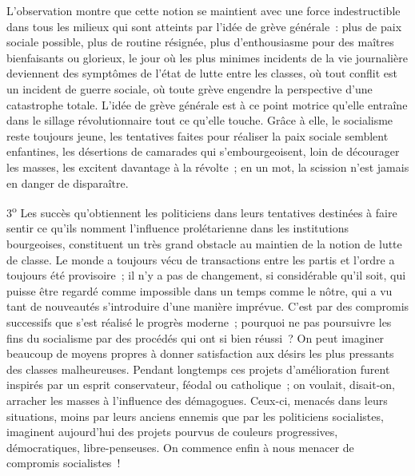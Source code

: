 \documentclass[french,twoside]{book} %
\begin{document}
L’observation montre que cette notion se maintient avec une force indestructible dans tous les milieux qui sont atteints par l’idée de grève générale : plus de paix sociale possible, plus de routine résignée, plus d’enthousiasme pour des maîtres bienfaisants ou glorieux, le jour où les plus minimes incidents de la vie journalière deviennent des symptômes de l’état de lutte entre les classes, où tout conflit est un incident de guerre sociale, où toute grève engendre la perspective d’une catastrophe totale. L’idée de grève générale est à ce point motrice qu’elle entraîne dans le sillage révolutionnaire tout ce qu’elle touche. Grâce à elle, le socialisme reste toujours jeune, les tentatives faites pour réaliser la paix sociale semblent enfantines, les désertions de camarades qui s’embourgeoisent, loin de décourager les masses, les excitent davantage à la révolte ; en un mot, la scission n’est jamais en danger de disparaître.\par
3\textsuperscript{o} Les succès qu’obtiennent les politiciens dans leurs tentatives destinées à faire sentir ce qu’ils nomment l’influence prolétarienne dans les institutions bourgeoises,  constituent un très grand obstacle au maintien de la notion de lutte de classe. Le monde a toujours vécu de transactions entre les partis et l’ordre a toujours été provisoire ; il n’y a pas de changement, si considérable qu’il soit, qui puisse être regardé comme impossible dans un temps comme le nôtre, qui a vu tant de nouveautés s’introduire d’une manière imprévue. C’est par des compromis successifs que s’est réalisé le progrès moderne ; pourquoi ne pas poursuivre les fins du socialisme par des procédés qui ont si bien réussi ? On peut imaginer beaucoup de moyens propres à donner satisfaction aux désirs les plus pressants des classes malheureuses. Pendant longtemps ces projets d’amélioration furent inspirés par un esprit conservateur, féodal ou catholique ; on voulait, disait-on, arracher les masses à l’influence des démagogues. Ceux-ci, menacés dans leurs situations, moins par leurs anciens ennemis que par les politiciens socialistes, imaginent aujourd’hui des projets pourvus de couleurs progressives, démocratiques, libre-penseuses. On commence enfin à nous menacer de compromis socialistes !\par
\end{document}
